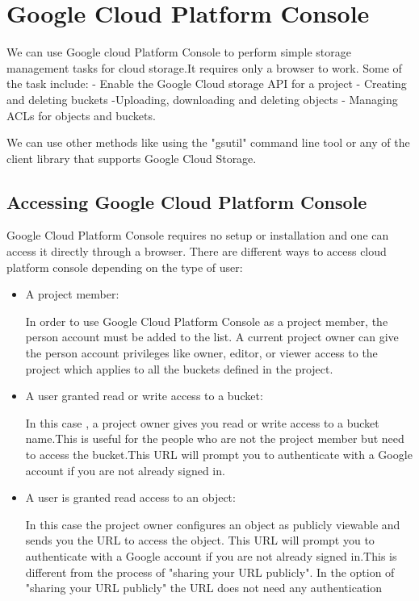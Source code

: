 \documentclass[9pt,twocolumn,twoside]{styles/osajnl}
\begin{document}
\section{Google Cloud Platform Console }

We can use Google cloud Platform Console to perform simple storage management tasks for cloud storage.It requires only a browser to work. Some of the task include:
- Enable the Google Cloud storage API for a project
- Creating and deleting buckets 
-Uploading, downloading and deleting objects
- Managing ACLs for objects and buckets.


We can use other methods like using the "gsutil" command line tool or any of the client library that supports Google Cloud Storage.

\subsection{Accessing Google Cloud Platform Console}


Google Cloud Platform Console requires no setup or installation and one can access it directly through a browser. There are different ways to access cloud platform console depending on the type of user:

\begin{itemize}
\item A project member: 

In order to use Google Cloud Platform Console as a project member, the person account must be added to the list. A current project owner can give the person account privileges like owner, editor, or viewer access to the project which applies to all the buckets defined in the project.

\item A user granted read or write access to a bucket:

In this case , a project owner  gives you read or write access to a bucket name.This is useful for the people who are not the project member but need to access the bucket.This URL will prompt you to authenticate with a Google account if you are not already signed in.
	

\item A user is granted read access to an object:

In this case the project owner configures an object as publicly viewable and sends you the URL to access the object. This URL will prompt you to authenticate with a Google account if you are not already signed in.This is different from the process of "sharing your URL publicly". In the option of "sharing your URL publicly" the URL does not need any authentication

\end{itemize}
\end{document}
